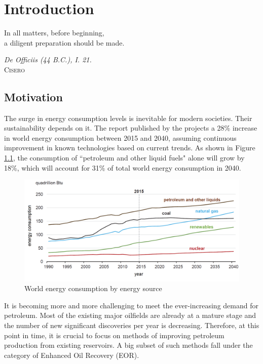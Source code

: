 \chapter{Introduction}
\vspace*{\fill}
\epigraph{In all matters, before beginning,\\ a diligent preparation should be made.}%
{\textit{De Officiis (44 B.C.), I. 21.}\\ \textsc{Cisero}}
\clearpage{\thispagestyle{empty}\cleardoublepage}
\section{Motivation}

The surge in energy consumption levels is inevitable for modern societies. Their sustainability depends on it. The  report \citeyearpar{EIA2017} published by the  projects a 28\% increase in world energy consumption between 2015 and 2040, assuming continuous improvement in known technologies based on current trends. As shown in Figure \ref{cht:energySources}, the consumption of ``petroleum and other liquid fuels" alone will grow by 18\%, which will account for 31\% of total world energy consumption in 2040.

\begin{figure}[b!]
    \centering
    \includegraphics[width=\textwidth]{img/cht/chtEiaEnergy.png}
    \caption{World energy consumption by energy source \citep{EIA2017}}
    \label{cht:energySources}
\end{figure}

It is becoming more and more challenging to meet the ever-increasing demand for petroleum. Most of the existing major oilfields are already at a mature stage and the number of new significant discoveries per year is decreasing. Therefore, at this point in time, it is crucial to focus on methods of improving petroleum production from existing reservoirs. A big subset of such methods fall under the category of Enhanced Oil Recovery (EOR).

